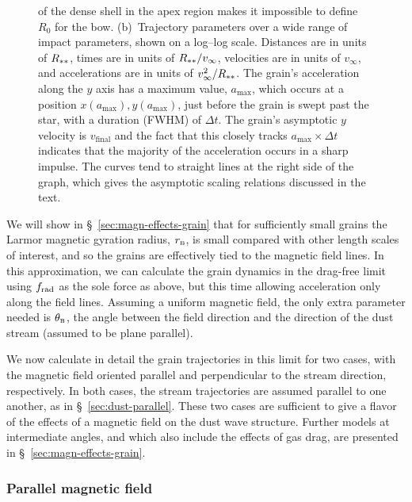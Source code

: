 \begin{figure}
{    of the dense shell in the apex region makes it impossible to
    define \(R_0\) for the bow.  (b)~Trajectory parameters over a wide
    range of impact parameters, shown on a log--log scale. Distances
    are in units of \(R_{**}\), times are in units of
    \(R_{**} / v_\infty\), velocities are in units of \(v_\infty\), and
    accelerations are in units of \(v_\infty^2 / R_{**}\). The grain's
    acceleration along the \(y\) axis has a maximum value,
    \(a_{\text{max}}\), which occurs at a position
    \(x(a_{\text{max}}), y(a_{\text{max}})\), just before the grain is
    swept past the star, with a duration (FWHM) of \(\Delta t\).  The
    grain's asymptotic \(y\) velocity is \(v_{\text{final}}\) and the
    fact that this closely tracks \(a_{\text{max}} \times \Delta t\) indicates
    that the majority of the acceleration occurs in a sharp impulse.
    The curves tend to straight lines at the right side of the graph,
    which gives the asymptotic scaling relations discussed in the
    text.}
  \label{fig:inertia-thB90}
\end{figure}

We will show in \S~\ref{sec:magn-effects-grain} that for
sufficiently small grains the Larmor magnetic gyration radius,
\(r_{\scriptscriptstyle\text{B}}\), is small compared with other length scales of interest, and
so the grains are effectively tied to the magnetic field lines.  In
this approximation, we can calculate the grain dynamics in the
drag-free limit using \(f_{\text{rad}}\) as the sole force as above, but this
time allowing acceleration only along the field lines.  Assuming a
uniform magnetic field, the only extra parameter needed is
\(\theta_{\scriptscriptstyle\text{B}}\), the angle between the field direction and the direction of
the dust stream (assumed to be plane parallel).

We now calculate in detail the grain trajectories in this limit for
two cases, with the magnetic field oriented parallel and perpendicular
to the stream direction, respectively. In both cases, the stream
trajectories are assumed parallel to one another, as in
\S~\ref{sec:dust-parallel}. These two cases are sufficient to give a
flavor of the effects of a magnetic field on the dust wave structure.
Further models at intermediate angles, and which also include the
effects of gas drag, are presented in \S~\ref{sec:magn-effects-grain}.

\subsubsection{Parallel magnetic field}
\label{sec:parall-magn-field}


